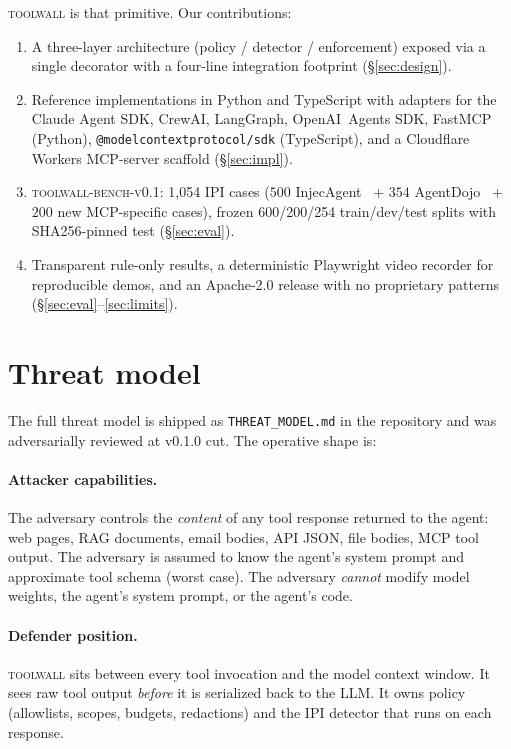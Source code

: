 \textsc{toolwall} is that primitive. Our contributions:
\begin{enumerate}[leftmargin=*,nosep]
\item A three-layer architecture (policy / detector / enforcement)
exposed via a single decorator with a four-line integration
footprint (\S\ref{sec:design}).
\item Reference implementations in Python and TypeScript with
adapters for the Claude Agent SDK, CrewAI, LangGraph, OpenAI~Agents
SDK, FastMCP (Python), \texttt{@modelcontextprotocol/sdk}
(TypeScript), and a Cloudflare Workers MCP-server scaffold
(\S\ref{sec:impl}).
\item \textsc{toolwall-bench-v0.1}: 1{,}054 IPI cases
($500$ InjecAgent~\cite{zhan2024injecagent} +
$354$ AgentDojo~\cite{debenedetti2024agentdojo} +
$200$ new MCP-specific cases), frozen 600/200/254 train/dev/test
splits with SHA256-pinned test (\S\ref{sec:eval}).
\item Transparent rule-only results, a deterministic Playwright
video recorder for reproducible demos, and an Apache-2.0 release
with no proprietary patterns (\S\ref{sec:eval}--\ref{sec:limits}).
\end{enumerate}

\section{Threat model}
\label{sec:threat}

The full threat model is shipped as \texttt{THREAT\_MODEL.md} in
the repository and was adversarially reviewed at v0.1.0 cut. The
operative shape is:

\paragraph{Attacker capabilities.}
The adversary controls the \emph{content} of any tool response
returned to the agent: web pages, RAG documents, email bodies,
API JSON, file bodies, MCP tool output. The adversary is assumed
to know the agent's system prompt and approximate tool schema
(worst case). The adversary \emph{cannot} modify model weights,
the agent's system prompt, or the agent's code.

\paragraph{Defender position.}
\textsc{toolwall} sits between every tool invocation and the model
context window. It sees raw tool output \emph{before} it is
serialized back to the LLM. It owns policy
(allowlists, scopes, budgets, redactions) and the IPI detector
that runs on each response.

